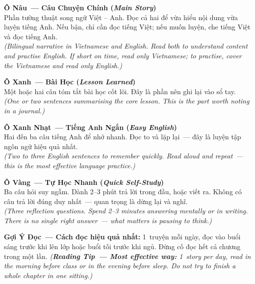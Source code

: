 \begin{tcolorbox}[
  colback=truyengold!8,
  colframe=truyengold!70!black,
  coltitle=black,
  fonttitle=\bfseries,
  title={Giải Thích Các Ô Màu Trong Sách \quad\textit{\small(Color-Box Guide)}},
  arc=4pt, boxrule=1pt, breakable, enhanced
]

\smallskip
\textbf{\color{truyenred}Ô Nâu~--- Câu Chuyện Chính (\textit{Main Story})}\\
Phần tường thuật song ngữ Việt -- Anh. Đọc cả hai để vừa hiểu nội dung vừa luyện tiếng Anh. Nếu bận, chỉ cần đọc tiếng Việt; nếu muốn luyện, che tiếng Việt và đọc tiếng Anh.\\
\textit{(Bilingual narrative in Vietnamese and English. Read both to understand content and practise English. If short on time, read only Vietnamese; to practise, cover the Vietnamese and read only English.)}

\medskip
\textbf{\color{truyenblue}Ô Xanh~--- Bài Học (\textit{Lesson Learned})}\\
Một hoặc hai câu tóm tắt bài học cốt lõi. Đây là phần nên ghi lại vào sổ tay.\\
\textit{(One or two sentences summarising the core lesson. This is the part worth noting in a journal.)}

\medskip
\textbf{\color{truyenblue!60}Ô Xanh Nhạt~--- Tiếng Anh Ngắn (\textit{Easy English})}\\
Hai đến ba câu tiếng Anh để nhớ nhanh. Đọc to và lặp lại~--- đây là luyện tập ngôn ngữ hiệu quả nhất.\\
\textit{(Two to three English sentences to remember quickly. Read aloud and repeat~--- this is the most effective language practice.)}

\medskip
\textbf{\color{truyengold!80!black}Ô Vàng~--- Tự Học Nhanh (\textit{Quick Self-Study})}\\
Ba câu hỏi suy ngẫm. Dành 2--3 phút trả lời trong đầu, hoặc viết ra. Không có câu trả lời đúng duy nhất~--- quan trọng là dừng lại và nghĩ.\\
\textit{(Three reflection questions. Spend 2--3 minutes answering mentally or in writing. There is no single right answer~--- what matters is pausing to think.)}

\smallskip
\end{tcolorbox}

\vspace{6pt}

\begin{baihoc}
\textbf{Gợi Ý Đọc~--- Cách đọc hiệu quả nhất:} 1~truyện mỗi ngày, đọc vào buổi sáng trước khi lên lớp hoặc buổi tối trước khi ngủ. Đừng cố đọc hết cả chương trong một lần.
\textit{(\textbf{Reading Tip~--- Most effective way:} 1~story per day, read in the morning before class or in the evening before sleep. Do not try to finish a whole chapter in one sitting.)}
\end{baihoc}

